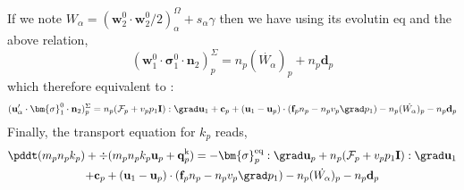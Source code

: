 If we note $W_\alpha = (\textbf{w}_2^0\cdot \textbf{w}_2^0/2)^\Omega_\alpha+ s_\alpha\gamma$ then we have using its evolutin eq and the above relation,
\begin{equation}
    (\textbf{w}_1^0 \cdot \bm{\sigma}_1^0 \cdot  \textbf{n}_2)^\Sigma_p
    = 
    n_p (\dot{ W_\alpha})_p
    + n_p \textbf{d}_p
\end{equation}
which therefore equivalent to : 
\begin{equation}
     (\textbf{u}_\alpha' \cdot \bm{\sigma}_1^0 \cdot  \textbf{n}_2)^\Sigma_p
    =
    n_p(\mathcal{F}_p + v_p p_1 \textbf{I}): \grad \textbf{u}_1
    + \textbf{c}_p
    + (\textbf{u}_1 - \textbf{u}_p) \cdot (\textbf{f}_pn_p - n_pv_p\grad p_1)
    - n_p (\dot{ W_\alpha})_p
    - n_p \textbf{d}_p
\end{equation}
Finally, the transport equation for $k_p$ reads, 
\begin{multline*}
    \pddt(m_p n_pk_p)
    + \div(m_pn_p k_p \textbf{u}_p 
    + \textbf{q}_p^\text{k})
    = 
     - \bm{\sigma}_p^\text{eq}  :\grad \textbf{u}_p
     + 
     n_p(\mathcal{F}_p + v_p p_1 \textbf{I}): \grad \textbf{u}_1\\
     + \textbf{c}_p
    + (\textbf{u}_1 - \textbf{u}_p) \cdot (\textbf{f}_pn_p - n_pv_p\grad p_1)
    - n_p (\dot{ W_\alpha})_p
    - n_p \textbf{d}_p
    \\
\end{multline*}

